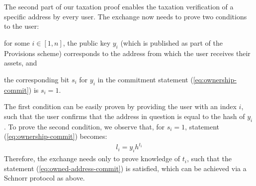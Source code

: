 The second part of our taxation proof enables the taxation verification of a
specific address by every user. The exchange now needs to prove two conditions
to the user:
\begin{inparaenum}[i)]
    \item for some $i \in [1, n]$, the public key $y_i$ (which is published as
        part of the Provisions scheme) corresponds to the address from which
        the user receives their assets, and
    \item the corresponding bit $s_i$ for $y_i$ in the commitment statement
        (\ref{eq:ownership-commit}) is $s_i = 1$.
\end{inparaenum}
The first condition can be easily proven by providing the user with an index
$i$, such that the user confirms that the address in question is equal to the
hash of $y_i$. To prove the second condition, we observe that, for $s_i = 1$,
statement (\ref{eq:ownership-commit}) becomes:
\begin{align}
    l_i = y_ih^{t_i} \label{eq:owned-address-commit}
\end{align}
Therefore, the exchange needs only to prove knowledge of $t_i$, such that the
statement (\ref{eq:owned-address-commit}) is satisfied, which can be achieved
via a Schnorr protocol as above.

